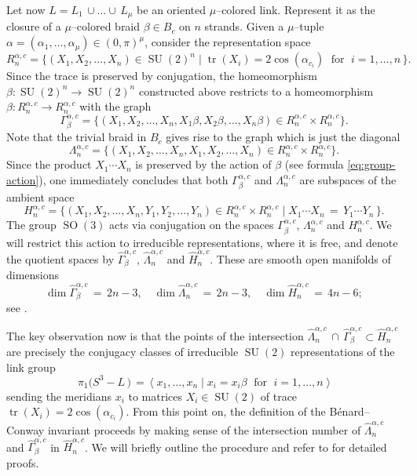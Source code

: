 \documentclass[11pt,reqno]{amsart}
\theoremstyle{definition}
\newcommand{\tr}{\operatorname{tr}}
\newcommand{\SU}{\operatorname{SU}}
\newcommand{\SO}{\operatorname{SO}}
\begin{document}
\begin{sloppypar}
Let now $L = L_1\,\cup\ldots\cup\,L_{\mu}$ be an oriented $\mu$--colored link. Represent it as the closure of a $\mu$--colored braid $\beta \in B_c$ on $n$ strands. Given a $\mu$--tuple $\alpha = (\alpha_1,\ldots,\alpha_{\mu}) \in (0,\pi)^{\mu}$, consider the representation space
\[
R_n^{\alpha, c} = \big\lbrace \left( X_1, X_2, \dots, X_n \right) \in \SU(2)^n \; \big| \; \tr(X_i) = 2 \cos(\alpha_{c_i})\; \text{ for }\; i = 1, \ldots, n \, \big\rbrace.
\]
Since the trace is preserved by conjugation, the homeomorphism $\beta: \SU(2)^n \to \SU(2)^n$ constructed above restricts to a homeomorphism $\beta: R_n^{\alpha, c} \to R_n^{\alpha, c}$ with the graph 
\[
\Gamma_{\beta}^{\alpha,c} = \big\lbrace \left( X_1, X_2, \dots, X_n, X_1 \beta, X_2 \beta, \dots, X_n \beta \right) \in R_n^{\alpha, c} \times R_n^{\alpha, c} \big\rbrace.
\]
Note that the trivial braid in $B_c$ gives rise to the graph which is just the diagonal 
\[
\Lambda_n^{\alpha, c} = \big\lbrace \left( X_1, X_2, \dots, X_n, X_1, X_2, \dots, X_n \right) \in R_n^{\alpha, c} \times R_n^{\alpha, c} \big\rbrace.
\]
Since the product $X_1\cdots X_n$ is preserved by the action of $\beta$ (see formula \eqref{eq:group-action}), one immediately concludes that both $\Gamma_{\beta}^{\alpha,c}$ and $\Lambda_n^{\alpha, c}$ are subspaces of the ambient space 
\[
H_n^{\alpha, c} = \big\lbrace \left( X_1, X_2, \dots, X_n, Y_1, Y_2, \dots, Y_n \right) \in R_n^{\alpha, c} \times R_n^{\alpha, c} \; \big| \; X_1\cdots X_n\, =\, Y_1\cdots Y_n\, \big\rbrace.
\]
The group $\SO(3)$ acts via conjugation on the spaces $\Gamma_{\beta}^{\alpha,c}$, $\Lambda_n^{\alpha, c}$ and $H_n^{\alpha, c}$. We will restrict this action to irreducible representations, where it is free, and denote the quotient spaces by $\widehat{\Gamma}_{\beta}^{\alpha,c}$, $\widehat{\Lambda}_n^{\alpha, c}$ and $\widehat{H}_n^{\alpha, c}$. These are smooth open manifolds of dimensions 
\[
\dim \widehat{\Gamma}_{\beta}^{\alpha,c}\, =\, 2n - 3,\quad \dim \widehat{\Lambda}_n^{\alpha, c}\, =\, 2n - 3,\quad \dim \widehat{H}_n^{\alpha, c}\, =\, 4n - 6;
\]
see \cite[Lemma 3.4]{Benard-Conway}. 

The key observation now is that the points of the intersection $\widehat{\Lambda}_n^{\alpha, c}\,\cap\,\widehat{\Gamma}_{\beta}^{\alpha,c} \subset \widehat{H}_n^{\alpha, c}$ are precisely the conjugacy classes of irreducible $\SU(2)$ representations of the link group 
\begin{equation}\label{E:presentation}
\pi_1 \big(S^3 - L\,\big)\, =\, \big\langle\; x_1,\ldots,x_n\; \big|\; x_i = x_i\beta\; \text{ for }\; i = 1,\ldots, n\;\big\rangle
\end{equation}
sending the meridians $x_i$ to matrices $X_i \in \SU(2)$ of trace $\tr (X_i) = 2\cos(\alpha_{c_i})$. From this point on, the definition of the B{\'e}nard--Conway invariant proceeds by making sense of the intersection number of $\widehat{\Lambda}_n^{\alpha, c}$ and $\widehat{\Gamma}_{\beta}^{\alpha,c}$ in $\widehat{H}_n^{\alpha, c}$. We will briefly outline the procedure and refer to \cite{Benard-Conway} for detailed proofs. 


\end{sloppypar}
\end{document}
